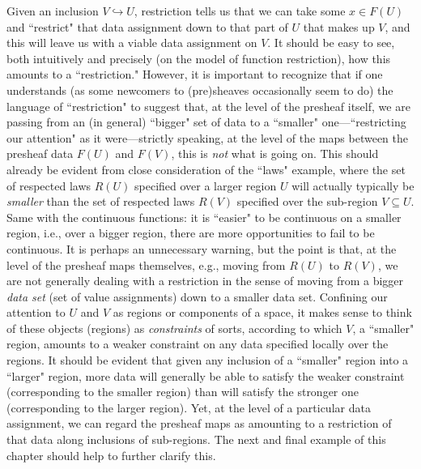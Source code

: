 \documentclass[11pt]{book}
\theoremstyle{definition}
\theoremstyle{definition}
\theoremstyle{definition}
\theoremstyle{theorem}
\theoremstyle{definition}
\begin{document}
Given an inclusion $V \hookrightarrow U$, restriction tells us that we can take some $x \in F(U)$ and ``restrict" that data assignment down to that part of $U$ that makes up $V$, and this will leave us with a viable data assignment on $V$. It should be easy to see, both intuitively and precisely (on the model of function restriction), how this amounts to a ``restriction." However, it is important to recognize that if one understands (as some newcomers to (pre)sheaves occasionally seem to do) the language of ``restriction" to suggest that, at the level of the presheaf itself, we are passing from an (in general) ``bigger" set of data to a ``smaller" one---``restricting our attention" as it were---strictly speaking, at the level of the maps between the presheaf data $F(U)$ and $F(V)$, this is \textit{not} what is going on. This should already be evident from close consideration of the ``laws" example, where the set of respected laws $R(U)$ specified over a larger region $U$ will actually typically be \textit{smaller} than the set of respected laws $R(V)$ specified over the sub-region $V \subseteq U$. Same with the continuous functions: it is ``easier" to be continuous on a smaller region, i.e., over a bigger region, there are more opportunities to fail to be continuous. It is perhaps an unnecessary warning, but the point is that, at the level of the presheaf maps themselves, e.g., moving from $R(U)$ to $R(V)$, we are not generally dealing with a restriction in the sense of moving from a bigger \textit{data set} (set of value assignments) down to a smaller data set. Confining our attention to $U$ and $V$ as regions or components of a space, it makes sense to think of these objects (regions) as \textit{constraints} of sorts, according to which $V$, a ``smaller" region, amounts to a weaker constraint on any data specified locally over the regions. It should be evident that given any inclusion of a ``smaller" region into a ``larger" region, more data will generally be able to satisfy the weaker constraint (corresponding to the smaller region) than will satisfy the stronger one (corresponding to the larger region). Yet, at the level of a particular data assignment, we can regard the presheaf maps as amounting to a restriction of that data along inclusions of sub-regions. The next and final example of this chapter should help to further clarify this.
\end{document}
